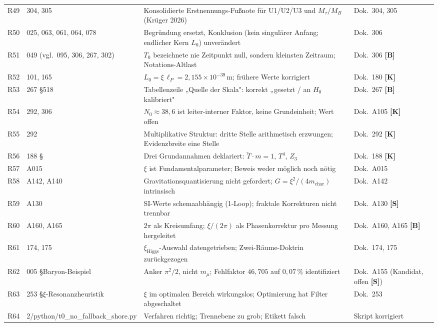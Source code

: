 \begin{longtable}{@{}p{1.2cm}p{3.4cm}p{5.8cm}p{3.4cm}@{}}
R49 & 304, 305 & Konsolidierte Erstnennungs-Fußnote für U1/U2/U3 und $M_\tau/M_B$ (Krüger 2026) & Dok.~304, 305 \\
R50 & 025, 063, 061, 064, 078 & Begründung ersetzt, Konklusion (kein singulärer Anfang; endlicher Kern $L_0$) unverändert & Dok.~306 \\
R51 & 049 (vgl.\ 095, 306, 267, 302) & $T_0$ bezeichnete nie Zeitpunkt null, sondern kleinsten Zeitraum; Notations-Altlast & Dok.~306 \textbf{[B]} \\
R52 & 101, 165 & $L_0 = \xi\,\ell_P = 2{,}155\times10^{-39}$\,m; frühere Werte korrigiert & Dok.~180 \textbf{[K]} \\
R53 & 267 \S518 & Tabellenzeile „Quelle der Skala": korrekt „gesetzt / an $H_0$ kalibriert" & Dok.~267 \textbf{[B]} \\
R54 & 292, 306 & $N_0 \approx 38{,}6$ ist leiter-interner Faktor, keine Grundeinheit; Wert offen & Dok.~A105 \textbf{[K]} \\
R55 & 292 & Multiplikative Struktur: dritte Stelle arithmetisch erzwungen; Evidenzbreite eine Stelle & Dok.~292 \textbf{[K]} \\
R56 & 188 \S & Drei Grundannahmen deklariert: $\tilde{T}\cdot m=1$, $T^4$, $Z_3$ & Dok.~188 \textbf{[K]} \\
R57 & A015 & $\xi$ ist Fundamentalparameter; Beweis weder möglich noch nötig & Dok.~A015 \\
R58 & A142, A140 & Gravitationsquantisierung nicht gefordert; $G=\xi^2/(4m_\text{char})$ intrinsisch & Dok.~A142 \\
R59 & A130 & SI-Werte schemaabhängig (1-Loop); fraktale Korrekturen nicht trennbar & Dok.~A130 \textbf{[S]} \\
R60 & A160, A165 & $2\pi$ als Kreisumfang; $\xi/(2\pi)$ als Phasenkorrektur pro Messung hergeleitet & Dok.~A160, A165 \textbf{[B]} \\
R61 & 174, 175 & $\xi_\text{Higgs}$-Auswahl datengetrieben; Zwei-Räume-Doktrin zurückgezogen & Dok.~174, 175 \\
R62 & 005 \S Baryon-Beispiel & Anker $\pi^2/2$, nicht $m_\mu$; Fehlfaktor $46{,}705$ auf $0{,}07\,\%$ identifiziert & Dok.~A155 (Kandidat, offen \textbf{[S]}) \\
R63 & 253 \S $\xi$-Resonanzheuristik & $\xi$ im optimalen Bereich wirkungslos; Optimierung hat Filter abgeschaltet & Dok.~253 \\
R64 & 2/python/t0\_no\_fallback\_shore.py & Verfahren richtig; Trennebene zu grob; Etikett falsch & Skript korrigiert \\

\end{longtable}

